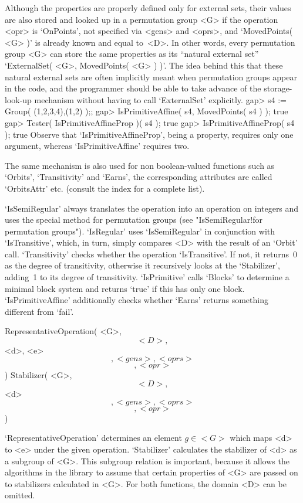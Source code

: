 Although  the properties are  properly   defined only for external  sets,
their values are also stored and looked up  in a permutation group <G> if
the operation  <opr> is `OnPoints', not specified  via <gens> and <oprs>,
and `MovedPoints( <G>   )' is already known  and  equal to~<D>.  In other
words, every permutation  group <G> can  store the same properties as its
``natural external set'' `ExternalSet( <G>,   MovedPoints( <G> ) )'.  The
idea behind  this that these natural external  sets are  often implicitly
meant when permutation   groups appear in the  code,   and the programmer
should be  able to take advance  of the storage-look-up mechanism without
having to call `ExternalSet' explicitly.
\beginexample
    gap> s4 := Group( (1,2,3,4),(1,2) );;
    gap> IsPrimitiveAffine( s4, MovedPoints( s4 ) );
    true
    gap> Tester( IsPrimitiveAffineProp )( s4 );  
    true
    gap> IsPrimitiveAffineProp( s4 );
    true
\endexample
Observe that `IsPrimitiveAffineProp', being a property, requires only one
argument, whereas `IsPrimitiveAffine' requires two.

The same mechanism is also used  for non boolean-valued functions such as
`Orbits', `Transitivity' and `Earns', the corresponding {\GAP} attributes
are called `OrbitsAttr' etc. (consult the index for a complete list).

`IsSemiRegular'  always translates the  operation  into  an operation  on
integers and   uses   the special  method  for  permutation  groups  (see
"IsSemiRegular!for permutation groups"). `IsRegular' uses `IsSemiRegular'
in conjunction  with `IsTransitive', which, in  turn, simply compares <D>
with  the result of an   `Orbit' call. `Transitivity'  checks whether the
operation  `IsTransitive'.    If  not, it returns~0     as  the degree of
transitivity, otherwise   it   recursively looks   at  the  `Stabilizer',
adding~1  to its degree of transitivity.  `IsPrimitive' calls `Blocks' to
determine a minimal block system and returns `true'  if this has only one
block.  `IsPrimitiveAffine'  additionally checks whether  `Earns' returns
something different from `fail'.

\>RepresentativeOperation( <G>, \[ <D>, \] <d>, <e> \[, <gens>, <oprs> %
                           \] \[, <opr> \] )
\>Stabilizer( <G>, \[ <D>, \] <d> \[, <gens>, <oprs> \] \[, <opr> \] )

`RepresentativeOperation' determines an element $g\in <G>$ which maps <d>
to <e> under the  given operation. `Stabilizer' calculates the stabilizer
of <d> as a subgroup of <G>. This subgroup relation is important, because
it allows the algorithms in the library to assume that certain properties
of   <G>  are passed  on  to  stabilizers  calculated  in  <G>. For  both
functions, the domain <D> can be omitted.

